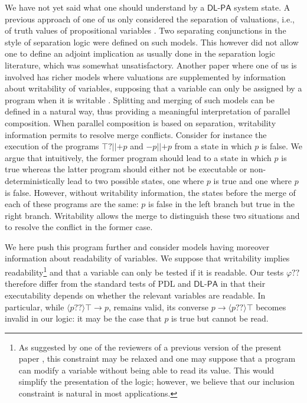\documentclass{llncs}
\newcommand{\pll}{ {||} }							%
\newcommand{\testendo}{?\!\!?}			%
\newcommand{\testpdl}{?}				%
\newcommand{\Dlpa}{\ensuremath{\mathsf{DL\text{-}PA}}\xspace}
\newcommand{\assgntopV}[1]{{\mathtt {+} #1}}
\newcommand{\assgnbotV}[1]{{\mathtt {-} #1}}
\newcommand{\ldia}[1]{ \big\langle #1 \big\rangle}
\newcommand{\limp}{ \rightarrow }
\renewcommand{\phi}{\varphi}
\begin{document}
We have not yet said what one should understand by a \Dlpa system state. 
A previous approach of one of us only considered the separation of valuations, i.e., 
of truth values of propositional variables \cite{Herzig-Wollic13}. 
Two separating conjunctions in the style of separation logic were defined on such models. 
This however did not allow one to define an adjoint implication as usually done in the separation logic literature, which was somewhat unsatisfactory. 
%
Another paper where one of us is involved has richer models where valuations are supplemented by information about writability of variables, supposing that a variable can only be assigned by a program when it is writable \cite{HerzigEtal-Ijcai19}. 
Splitting and merging of such models can be defined in a natural way, thus providing a meaningful interpretation of parallel composition. 
When parallel composition is based on separation, writability information permits to resolve merge conflicts.
Consider for instance the execution of the programs $\top \testpdl \pll \assgntopV p$ and $\assgnbotV p \pll \assgntopV p$ from a state in which $p$ is false.
We argue that intuitively, the former program should lead to a state in which $p$ is true
whereas the latter program should either not be executable
or non-deterministically lead to two possible states, one where $p$ is true and one where $p$ is false.
However, without writability information, the states before the merge of each of these programs are the same:
$p$ is false in the left branch but true in the right branch.
Writability allows the merge to distinguish these two situations and to resolve the conflict in the former case.

We here push this program further and consider models having moreover information about readability of variables. 
We suppose that writability implies readability\footnote{%
As suggested by one of the reviewers of a previous version of the present paper \cite{DBLP:conf/tap/BoudouHT19}, this constraint may be relaxed 
and one may suppose that a program can modify a variable without being able to read its value. 
This would simplify the presentation of the logic; however, we believe that our inclusion constraint is natural in most applications.
}
and that a variable can only be tested if it is readable. 
Our tests $\phi \testendo$ therefore differ from the standard tests of PDL and \Dlpa in that their 
executability depends on whether the relevant variables are readable. In particular, while 
$\ldia{ p \testendo } \top \limp p$, remains valid, its converse
$p \limp \ldia{ p \testendo } \top $ becomes invalid in our logic: 
it may be the case that $p$ is true but cannot be read.
\end{document}
